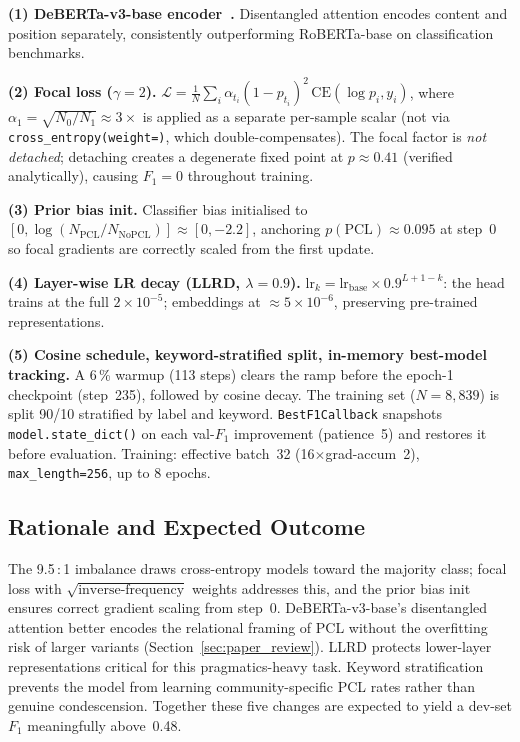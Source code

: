 \documentclass[11pt,a4paper]{article}
\begin{document}
\noindent\textbf{(1) DeBERTa-v3-base encoder~\cite{he2021debertav3}.} Disentangled attention
encodes content and position separately, consistently outperforming RoBERTa-base on
classification benchmarks.

\noindent\textbf{(2) Focal loss ($\gamma{=}2$).} $\mathcal{L} =
\frac{1}{N}\sum_i \alpha_{t_i}(1-p_{t_i})^2\,\mathrm{CE}(\log p_i, y_i)$, where
$\alpha_1{=}\sqrt{N_0/N_1}\approx3\times$ is applied as a separate per-sample
scalar (not via \texttt{cross\_entropy(weight=)}, which double-compensates). The
focal factor is \emph{not detached}; detaching creates a degenerate fixed point
at $p\approx0.41$ (verified analytically), causing $F_1{=}0$ throughout
training.

\noindent\textbf{(3) Prior bias init.} Classifier bias initialised to
$[0,\log(N_\text{PCL}/N_\text{NoPCL})]\approx[0,-2.2]$, anchoring $p(\text{PCL})\approx0.095$
at step~0 so focal gradients are correctly scaled from the first update.

\noindent\textbf{(4) Layer-wise LR decay (LLRD, $\lambda{=}0.9$).}
$\mathrm{lr}_k=\mathrm{lr}_\text{base}\times0.9^{L+1-k}$: the head trains at the full
$2\times10^{-5}$; embeddings at $\approx5\times10^{-6}$, preserving pre-trained representations.

\noindent\textbf{(5) Cosine schedule, keyword-stratified split, in-memory best-model tracking.}
A 6\,\% warmup (113 steps) clears the ramp before the epoch-1 checkpoint (step~235), followed
by cosine decay. The training set ($N{=}8{,}839$) is split 90/10 stratified by label and keyword.
\texttt{BestF1Callback} snapshots \texttt{model.state\_dict()} on each val-$F_1$ improvement
(patience~5) and restores it before evaluation. Training: effective batch~32
(16$\times$grad-accum~2), \texttt{max\_length=256}, up to 8 epochs.

\subsection{Rationale and Expected Outcome}
The 9.5\,:\,1 imbalance draws cross-entropy models toward the majority class; focal loss with
$\sqrt{\text{inverse-frequency}}$ weights addresses this, and the prior bias init ensures
correct gradient scaling from step~0. DeBERTa-v3-base's disentangled attention better encodes
the relational framing of PCL without the overfitting risk of larger variants
(Section~\ref{sec:paper_review}). LLRD protects lower-layer representations critical for this
pragmatics-heavy task. Keyword stratification prevents the model from learning community-specific
PCL rates rather than genuine condescension. Together these five changes are expected to yield
a dev-set $F_1$ meaningfully above~0.48.
\end{document}
